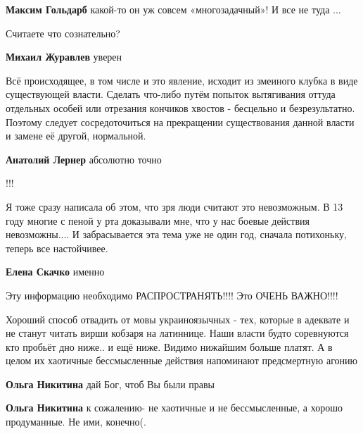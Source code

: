\begin{itemize}
\begin{itemize}
\textbf{Максим Гольдарб} какой-то он уж совсем «многозадачный»! И все не туда ...
\end{itemize} %

Считаете что сознательно?

\begin{itemize} %
\textbf{Михаил Журавлев} уверен
\end{itemize} %


Всё происходящее, в том числе и это явление, исходит из змеиного клубка в виде
существующей власти. Сделать что-либо путём попыток вытягивания оттуда
отдельных особей или отрезания кончиков хвостов - бесцельно и безрезультатно.
Поэтому следует сосредоточиться на прекращении существования данной власти и
замене её другой, нормальной.

\begin{itemize} %
\textbf{Анатолий Лернер} абсолютно точно
\end{itemize} %

!!!


Я тоже сразу написала об этом, что зря люди считают это невозможным. В 13 году
многие с пеной у рта доказывали мне, что у нас боевые действия невозможны.... И
забрасывается эта тема уже не один год, сначала потихоньку, теперь все
настойчивее.

\begin{itemize} %
\textbf{Елена Скачко} именно
\end{itemize} %

Эту информацию необходимо РАСПРОСТРАНЯТЬ!!!! Это ОЧЕНЬ ВАЖНО!!!!


Хороший способ отвадить от мовы украиноязычных - тех, которые в адеквате и не
станут читать вирши кобзаря на латиннице. Наши власти будто соревнуются кто
пробьёт дно ниже.. и ещё ниже. Видимо нижайшим больше платят. А в целом их
хаотичные бессмысленные действия напоминают предсмертную агонию

\begin{itemize} %
\textbf{Ольга Никитина} дай Бог, чтоб Вы были правы

\textbf{Ольга Никитина} к сожалению- не хаотичные и не бессмысленные, а хорошо продуманные. Не ими, конечно(.


\end{itemize}
\end{itemize}

